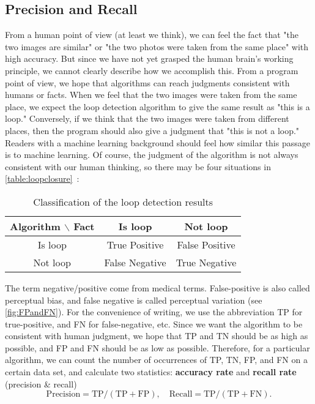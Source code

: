 \subsection{Precision and Recall}
From a human point of view (at least we think), we can feel the fact that "the two images are similar" or "the two photos were taken from the same place" with high accuracy. But since we have not yet grasped the human brain's working principle, we cannot clearly describe how we accomplish this. From a program point of view, we hope that algorithms can reach judgments consistent with humans or facts. When we feel that the two images were taken from the same place, we expect the loop detection algorithm to give the same result as "this is a loop." Conversely, if we think that the two images were taken from different places, then the program should also give a judgment that "this is not a loop." Readers with a machine learning background should feel how similar this passage is to machine learning.  Of course, the judgment of the algorithm is not always consistent with our human thinking, so there may be four situations in \autoref{table:loopclosure}~:


\begin{table}[!htp]
	\centering
	\caption{Classification of the loop detection results}
	\label{table:loopclosure}
	\begin{tabu}{c|c|c}
		\toprule
		Algorithm $\backslash$ Fact & Is loop & Not loop\\ 
		\midrule
		Is loop & True Positive & False Positive \\ 
		Not loop & False Negative & True Negative\\ 
		\bottomrule
	\end{tabu} 
\end{table}

The term negative/positive come from medical terms. False-positive is also called perceptual bias, and false negative is called perceptual variation (see \autoref{fig:FPandFN}). For the convenience of writing, we use the abbreviation TP for true-positive, and FN for false-negative, etc. Since we want the algorithm to be consistent with human judgment, we hope that TP and TN should be as high as possible, and FP and FN should be as low as possible. Therefore, for a particular algorithm, we can count the number of occurrences of TP, TN, FP, and FN on a certain data set, and calculate two statistics: \textbf{accuracy rate} and \textbf{recall rate} (precision \& recall)
\begin{equation}
	\mathrm{Precision} = \mathrm{TP}/(\mathrm{TP}+\mathrm{FP}), \quad \mathrm{Recall} = \mathrm{TP}/(\mathrm{TP}+\mathrm{FN}).
\end{equation}

